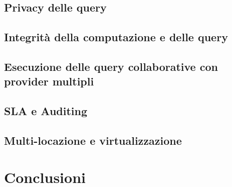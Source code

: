 \subsection{Privacy delle query}
\subsection{Integrità della computazione e delle query}
\subsection{Esecuzione delle query collaborative con provider multipli}
\subsection{SLA e Auditing}
\subsection{Multi-locazione e virtualizzazione}
\section{Conclusioni}